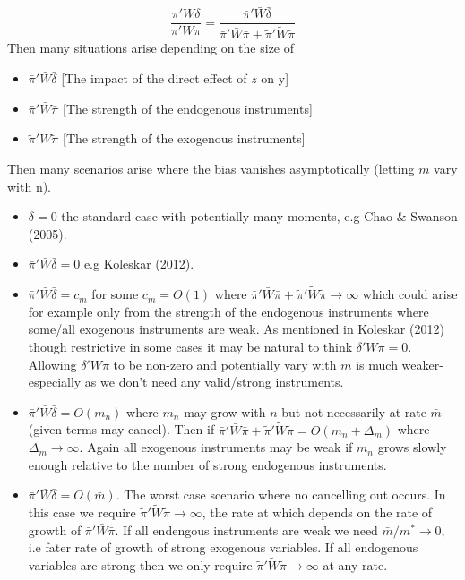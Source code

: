 \documentclass[11pt, fleqn]{article}
\begin{document}
\begin{equation}\frac{\pi'W\delta}{\pi'W\pi}=\frac{ \bar{\pi}'\bar{W}\bar{\delta}}{\bar{\pi}'\bar{W}\bar{\pi}+\tilde{\pi}'\tilde{W}\tilde{\pi}} \end{equation}
Then many situations arise depending on the size of
\begin{itemize}
  \item  $\bar{\pi}'\bar{W}\bar{\delta} $ [The impact of the direct effect of $z$ on y]
  \item $\bar{\pi}'\bar{W}\bar{\pi}$ [The strength of the endogenous instruments]
  \item $\tilde{\pi}'\tilde{W} \tilde{\pi}$  [The strength of the exogenous instruments]
\end{itemize}
Then many scenarios arise where the bias vanishes asymptotically (letting $m$ vary with n).
\begin{itemize}
\item $\delta=0$ the standard case with potentially many moments, e.g Chao \& Swanson (2005).
\item $\bar{\pi}'\bar{W}\bar{\delta}=0$  e.g Koleskar (2012).
\item $\bar{\pi}'\bar{W}\bar{\delta}=c_m$ for some $c_m=O(1)$ where $ \bar{\pi}'\bar{W}\bar{\pi}+\tilde{\pi}'\tilde{W}\tilde{\pi}\rightarrow \infty$ which could arise for example only from the strength of the endogenous instruments where some/all exogenous instruments are weak. As mentioned in Koleskar (2012) though restrictive in some cases it may be natural to think $\delta'W\pi=0$. Allowing $\delta'W\pi$ to be non-zero and potentially vary with $m$ is much weaker- especially as we don't need any valid/strong instruments.
 \item   $\bar{\pi}'\bar{W}\bar{\delta}=O(m_n)$ where $m_n$ may grow with $n$ but not necessarily at rate $\bar{m}$ (given terms may cancel). Then if $\bar{\pi}'\bar{W}\bar{\pi}+\tilde{\pi}'\tilde{W}\tilde{\pi}=O(m_n+\Delta_m)$ where $\Delta_m\rightarrow \infty$.   Again all exogenous instruments may be weak if $m_n$ grows slowly enough relative to the number of strong endogenous instruments.
     \item $\bar{\pi}'\bar{W}\bar{\delta}=O(\bar{m})$. The worst case scenario where no cancelling out occurs. In this case we require $\tilde{\pi}'\tilde{W}\tilde{\pi}\rightarrow \infty$, the rate at which depends on the rate of growth of $\bar{\pi}'\bar{W}\bar{\pi}$. If all endengous instruments are weak we need $\bar{m}/m^*\rightarrow 0$, i.e fater rate of growth of strong exogenous variables. If all endogenous variables are strong then we only require $\tilde{\pi}'\tilde{W}\tilde{\pi}\rightarrow \infty$ at any rate.

\end{itemize}
\end{document}
